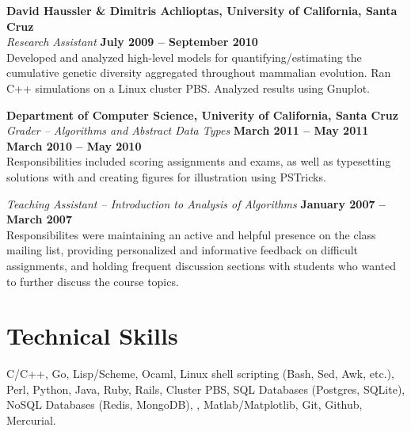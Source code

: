\documentclass[margin,line]{resume}
\begin{document}
\begin{resume}
    \textbf{David Haussler \& Dimitris Achlioptas, University of California, Santa Cruz} \vspace{2mm}\\\vspace{1mm}%
    \textsl{Research Assistant} \hfill \textbf{July 2009 -- September 2010}\\
    Developed and analyzed high-level models for quantifying/estimating
    the cumulative genetic diversity aggregated throughout mammalian
    evolution. Ran C++ simulations on a Linux cluster PBS. Analyzed
    results using Gnuplot.

    \textbf{Department of Computer Science, Univerity of California, Santa Cruz} \vspace{2mm}\\\vspace{1mm}%
    \textsl{Grader -- Algorithms and Abstract Data Types} \hfill \textbf{March 2011 -- May 2011}\\
    \vspace{0mm}    \hfill \textbf{March 2010 -- May 2010}\\
    Responsibilities included scoring assignments and exams, as well as
    typesetting solutions with \LaTeXe and creating figures for illustration
    using PSTricks.

    \textsl{Teaching Assistant -- Introduction to Analysis of Algorithms} \hfill \textbf{January 2007 -- March 2007}\\
    Responsibilites were maintaining an active and helpful presence
    on the class mailing list, providing personalized and informative
    feedback on difficult assignments, and holding frequent discussion
    sections with students who wanted to further discuss the course
    topics.

    \section{\mysidestyle Technical Skills} 

    C/C++, Go, Lisp/Scheme, Ocaml,
    Linux shell scripting (Bash, Sed, Awk, etc.),
    Perl, Python, Java, Ruby, Rails, Cluster PBS,
    SQL Databases (Postgres, SQLite),
    NoSQL Databases (Redis, MongoDB),
    \LaTeXe, Matlab/Matplotlib, Git, Github,
    Mercurial.


\end{resume}
\end{document}
